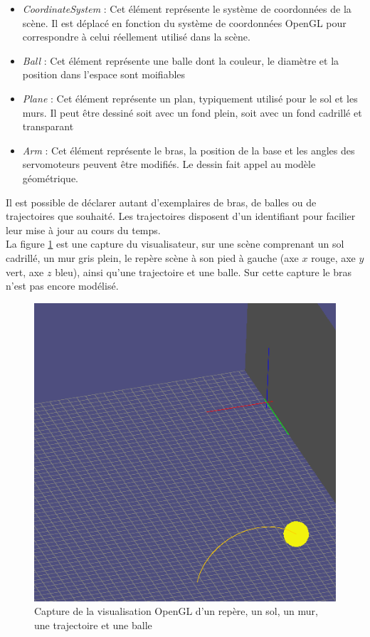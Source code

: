\documentclass{article}[11pt]
\begin{document}
\begin{itemize}
\item \textit{CoordinateSystem} : Cet élément représente le système de coordonnées de la scène. Il est déplacé en fonction du système de coordonnées OpenGL pour correspondre à celui réellement utilisé dans la scène.
\item \textit{Ball} : Cet élément représente une balle dont la couleur, le diamètre et la position dans l'espace sont moifiables
\item \textit{Plane} : Cet élément représente un plan, typiquement utilisé pour le sol et les murs. Il peut être dessiné soit avec un fond plein, soit avec un fond cadrillé et transparant
\item \textit{Arm} : Cet élément représente le bras, la position de la base et les angles des servomoteurs peuvent être modifiés. Le dessin fait appel au modèle géométrique. \\
\end{itemize}

Il est possible de déclarer autant d'exemplaires de bras, de balles ou de trajectoires que souhaité. Les trajectoires disposent d'un identifiant pour facilier leur mise à jour au cours du temps. \\

La figure \ref{viewer} est une capture du visualisateur, sur une scène comprenant un sol cadrillé, un mur gris plein, le repère scène à son pied à gauche (axe $x$ rouge, axe $y$ vert, axe $z$ bleu), ainsi qu'une trajectoire et une balle. Sur cette capture le bras n'est pas encore modélisé.
\begin{figure}[!htc]
	\begin{center}
		\includegraphics[scale=0.5]{images/viewer.png}
		\caption{Capture de la visualisation OpenGL d'un repère, un sol, un mur, une trajectoire et une balle} 
		\label{viewer}
	\end{center}
\end{figure}
\end{document}
